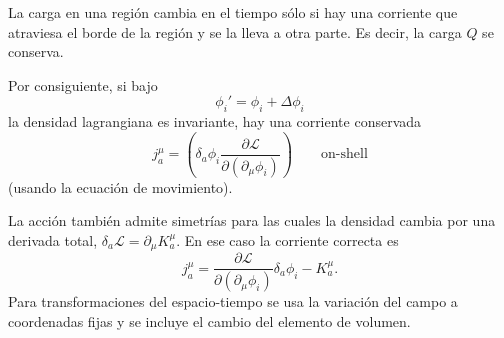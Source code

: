 \documentclass[11pt,a4paper]{article}
\begin{document}
La carga en una región cambia en el tiempo sólo si hay una corriente que atraviesa el borde de la región y se la lleva a otra parte. Es decir, la carga $Q$ se conserva.

Por consiguiente, si bajo
\[
  \phi_i'=\phi_i+\Delta\phi_i
\]
la densidad lagrangiana es invariante, hay una corriente conservada
\[
  j_a^\mu
  =\left(
    \delta_a\phi_i
    \frac{\partial\mathcal L}{\partial(\partial_\mu\phi_i)}
  \right)
  \qquad \text{on-shell}
\]
(usando la ecuación de movimiento).

La acción también admite simetrías para las cuales la densidad cambia
por una derivada total, $\delta_a\mathcal L=\partial_\mu K_a^\mu$.
En ese caso la corriente correcta es
\[
  j_a^\mu=
  \frac{\partial\mathcal L}{\partial(\partial_\mu\phi_i)}
  \delta_a\phi_i-K_a^\mu.
\]
Para transformaciones del espacio-tiempo se usa la variación del campo
a coordenadas fijas y se incluye el cambio del elemento de volumen.
\end{document}
